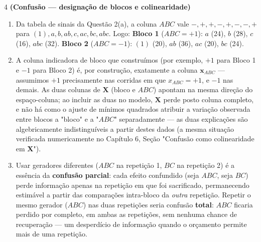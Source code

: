 \documentclass[11pt]{article}
\begin{document}
\begin{questao}{4} \textbf{(Confusão --- designação de blocos e colinearidade)}
\end{questao}
\begin{solucao}
\begin{enumerate}[label=(\alph*)]
  \item Da tabela de sinais da Questão 2(a), a coluna $ABC$ vale $-,+,+,-,+,-,-,+$ para
    $(1),a,b,ab,c,ac,bc,abc$. Logo:
    \textbf{Bloco 1} ($ABC=+1$): $a$ (24), $b$ (28), $c$ (16), $abc$ (32).
    \textbf{Bloco 2} ($ABC=-1$): $(1)$ (20), $ab$ (36), $ac$ (20), $bc$ (24).
  \item A coluna indicadora de bloco que construímos (por exemplo, $+1$ para Bloco 1 e $-1$ para
    Bloco 2) é, por construção, exatamente a coluna $\mathbf{x}_{ABC}$ --- assumimos $+1$
    precisamente nas corridas em que $x_{ABC}=+1$, e $-1$ nas demais. As duas colunas de
    $\mathbf{X}$ (bloco e $ABC$) apontam na mesma direção do espaço-coluna; ao incluir as duas no
    modelo, $\mathbf{X}$ perde posto coluna completo, e não há como o ajuste de mínimos quadrados
    atribuir a variação observada entre blocos a "bloco" e a "$ABC$" separadamente --- as duas
    explicações são algebricamente indistinguíveis a partir destes dados (a mesma situação
    verificada numericamente no Capítulo 6, Seção "Confusão como colinearidade em $\mathbf{X}$").
  \item Usar geradores diferentes ($ABC$ na repetição 1, $BC$ na repetição 2) é a essência da
    \textbf{confusão parcial}: cada efeito confundido (seja $ABC$, seja $BC$) perde informação
    apenas na repetição em que foi sacrificado, permanecendo estimável a partir das comparações
    intra-bloco da \emph{outra} repetição. Repetir o mesmo gerador ($ABC$) nas duas repetições
    seria confusão \textbf{total}: $ABC$ ficaria perdido por completo, em ambas as repetições,
    sem nenhuma chance de recuperação --- um desperdício de informação quando o orçamento permite
    mais de uma repetição.
\end{enumerate}
\end{solucao}
\end{document}

